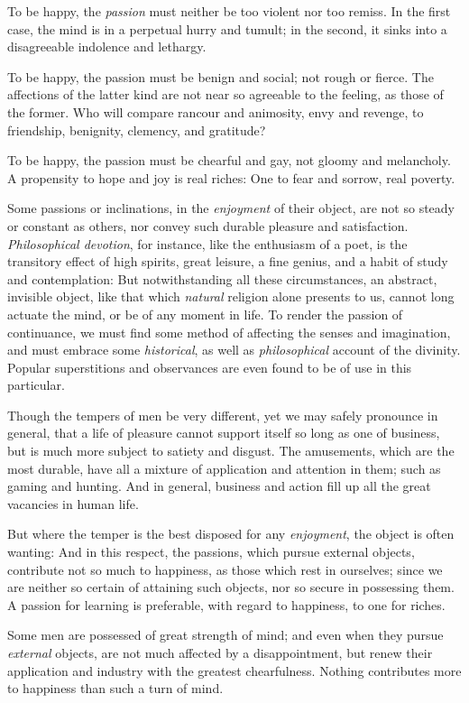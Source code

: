 To be happy, the \textit{passion} must neither be too violent nor too
remiss. In the first case, the mind is in a perpetual hurry and
tumult; in the second, it sinks into a disagreeable indolence and
lethargy.

To be happy, the passion must be benign and social; not rough or
fierce. The affections of the latter kind are not near so agreeable to
the feeling, as those of the former. Who will compare rancour and
animosity, envy and revenge, to friendship, benignity, clemency, and
gratitude?

To be happy, the passion must be chearful and gay, not gloomy and
melancholy. A propensity to hope and joy is real riches: One to fear
and sorrow, real poverty.

Some passions or inclinations, in the \textit{enjoyment} of their
object, are not so steady or constant as others, nor convey such
durable pleasure and satisfaction. \textit{Philosophical devotion},
for instance, like the enthusiasm of a poet, is the transitory effect
of high spirits, great leisure, a fine genius, and a habit of study
and contemplation: But notwithstanding all these circumstances, an
abstract, invisible object, like that which \textit{natural} religion
alone presents to us, cannot long actuate the mind, or be of any
moment in life. To render the passion of continuance, we must find
some method of affecting the senses and imagination, and must embrace
some \textit{historical}, as well as \textit{philosophical} account of
the divinity. Popular superstitions and observances are even found to
be of use in this particular.

Though the tempers of men be very different, yet we may safely
pronounce in general, that a life of pleasure cannot support itself so
long as one of business, but is much more subject to satiety and
disgust. The amusements, which are the most durable, have all a
mixture of application and attention in them; such as gaming and
hunting. And in general, business and action fill up all the great
vacancies in human life.

But where the temper is the best disposed for any
\textit{enjoyment}, the object is often wanting: And in this respect,
the passions, which pursue external objects, contribute not so much to
happiness, as those which rest in ourselves; since we are neither so
certain of attaining such objects, nor so secure in possessing them. A
passion for learning is preferable, with regard to happiness, to one
for riches.

Some men are possessed of great strength of mind; and even when they
pursue \textit{external} objects, are not much affected by a
disappointment, but renew their application and industry with the
greatest chearfulness. Nothing contributes more to happiness than such
a turn of mind.

